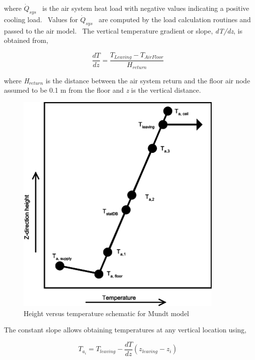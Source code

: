 where \({\dot Q_{sys}}\) ~is the air system heat load with negative values indicating a positive cooling load.~ Values for \({\dot Q_{sys}}\) ~are computed by the load calculation routines and passed to the air model.~ The vertical temperature gradient or slope, \emph{dT/dz}, is obtained from,

\begin{equation}
\frac{{dT}}{{dz}} = \frac{{{T_{Leaving}} - {T_{AirFloor}}}}{{{H_{return}}}}
\end{equation}

where \emph{H\(_{return}\)} is the distance between the air system return and the floor air node assumed to be 0.1 m from the floor and \emph{z} is the vertical distance.

\begin{figure}[hbtp] %
\centering
\includegraphics[width=0.9\textwidth, height=0.9\textheight, keepaspectratio=true]{media/image2341.svg.png}
\caption{Height versus temperature schematic for Mundt model \protect \label{fig:height-versus-temperature-schematic-for-mundt}}
\end{figure}

The constant slope allows obtaining temperatures at any vertical location using,

\begin{equation}
{T_{{a_i}}} = {T_{leaving}} - \frac{{dT}}{{dz}}({z_{leaving}} - {z_i})
\end{equation}

